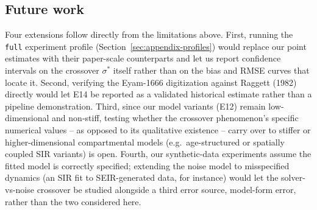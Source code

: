\subsection{Future work}
Four extensions follow directly from the limitations above. First, running the \texttt{full}
experiment profile (Section~\ref{sec:appendix-profiles}) would replace our point estimates with
their paper-scale counterparts and let us report confidence intervals on the crossover
$\sigma^*$ itself rather than on the bias and RMSE curves that locate it. Second, verifying the
Eyam-1666 digitization against Raggett (1982) directly would let E14 be reported as a validated
historical estimate rather than a pipeline demonstration. Third, since our model variants (E12)
remain low-dimensional and non-stiff, testing whether the crossover phenomenon's specific
numerical values -- as opposed to its qualitative existence -- carry over to stiffer or
higher-dimensional compartmental models (e.g.\ age-structured or spatially coupled SIR variants)
is open. Fourth, our synthetic-data experiments assume the fitted model is correctly specified;
extending the noise model to misspecified dynamics (an SIR fit to SEIR-generated data, for
instance) would let the solver-vs-noise crossover be studied alongside a third error source,
model-form error, rather than the two considered here.
